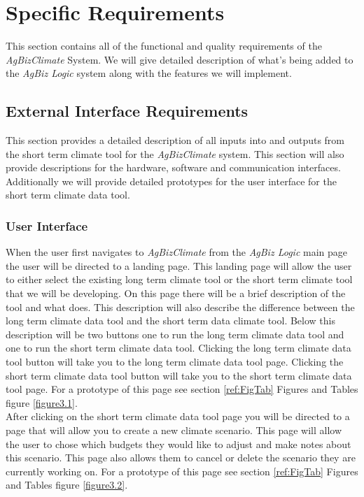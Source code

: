 \documentclass[onecolumn, draftclsnofoot,10pt, compsoc]{article}
\begin{document}
\section{Specific Requirements}
This section contains all of the functional and quality requirements of the \textit{AgBizClimate} System. We will give detailed description of what's being added to the \textit{AgBiz Logic} system along with the features we will implement.\\
    \subsection{External Interface Requirements}
		This section provides a detailed description of all inputs into and outputs from the short term climate tool for the \textit{AgBizClimate} system. This section will also provide descriptions for the hardware, software and communication interfaces. Additionally we will provide detailed prototypes for the user interface for the short term climate data tool.\\
        \subsubsection{User Interface}
					When the user first navigates to \textit{AgBizClimate} from the \textit{AgBiz Logic} main page the user will be directed to a landing page. This landing page will allow the user to either select the existing long term climate tool or the short term climate tool that we will be developing. On this page there will be a brief description of the tool and what does. This description will also describe the difference between the long term climate data tool and the short term data climate tool. Below this description will be two buttons one to run the long term climate data tool and one to run the short term climate data tool. Clicking the long term climate data tool button will take you to the long term climate data tool page. Clicking the short term climate data tool button will take you to the short term climate data tool page. For a prototype of this page see section \ref{ref:FigTab} Figures and Tables figure \ref{figure3.1}.\\

					After clicking on the short term climate data tool page you will be directed to a page that will allow you to create a new climate scenario. This page will allow the user to chose which budgets they would like to adjust and make notes about this scenario. This page also allows them to cancel or delete the scenario they are currently working on. For a prototype of this page see section \ref{ref:FigTab} Figures and Tables figure \ref{figure3.2}.\\
\end{document}
